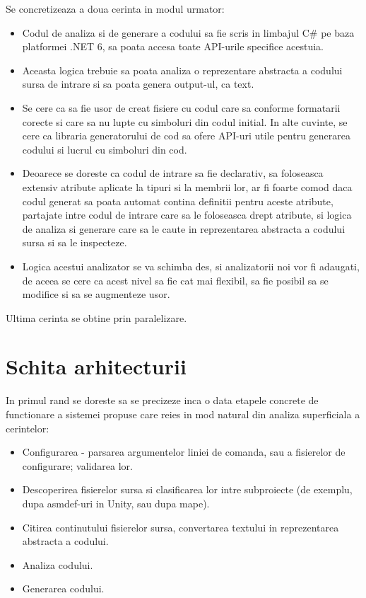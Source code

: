 \documentclass{report}
\begin{document}
Se concretizeaza a doua cerinta in modul urmator:

\begin{itemize}
\item
  Codul de analiza si de generare a codului sa fie scris in limbajul C\#
  pe baza platformei .NET 6, sa poata accesa toate API-urile specifice
  acestuia.
\item
  Aceasta logica trebuie sa poata analiza o reprezentare abstracta a
  codului sursa de intrare si sa poata genera output-ul, ca text.
\item
  Se cere ca sa fie usor de creat fisiere cu codul care sa conforme
  formatarii corecte si care sa nu lupte cu simboluri din codul initial.
  In alte cuvinte, se cere ca libraria generatorului de cod sa ofere
  API-uri utile pentru generarea codului si lucrul cu simboluri din cod.
\item
  Deoarece se doreste ca codul de intrare sa fie declarativ, sa
  foloseasca extensiv atribute aplicate la tipuri si la membrii lor, ar
  fi foarte comod daca codul generat sa poata automat contina definitii
  pentru aceste atribute, partajate intre codul de intrare care sa le
  foloseasca drept atribute, si logica de analiza si generare care sa le
  caute in reprezentarea abstracta a codului sursa si sa le inspecteze.
\item
  Logica acestui analizator se va schimba des, si analizatorii noi vor
  fi adaugati, de aceea se cere ca acest nivel sa fie cat mai flexibil,
  sa fie posibil sa se modifice si sa se augmenteze usor.
\end{itemize}

Ultima cerinta se obtine prin paralelizare.

\section{Schita arhitecturii}

In primul rand se doreste sa se precizeze inca o data etapele concrete
de functionare a sistemei propuse care reies in mod natural din analiza
superficiala a cerintelor:

\begin{itemize}
\item
  Configurarea - parsarea argumentelor liniei de comanda, sau a
  fisierelor de configurare; validarea lor.
\item
  Descoperirea fisierelor sursa si clasificarea lor intre subproiecte
  (de exemplu, dupa asmdef-uri in Unity, sau dupa mape).
\item
  Citirea continutului fisierelor sursa, convertarea textului in
  reprezentarea abstracta a codului.
\item
  Analiza codului.
\item
  Generarea codului.
\end{itemize}
\end{document}
